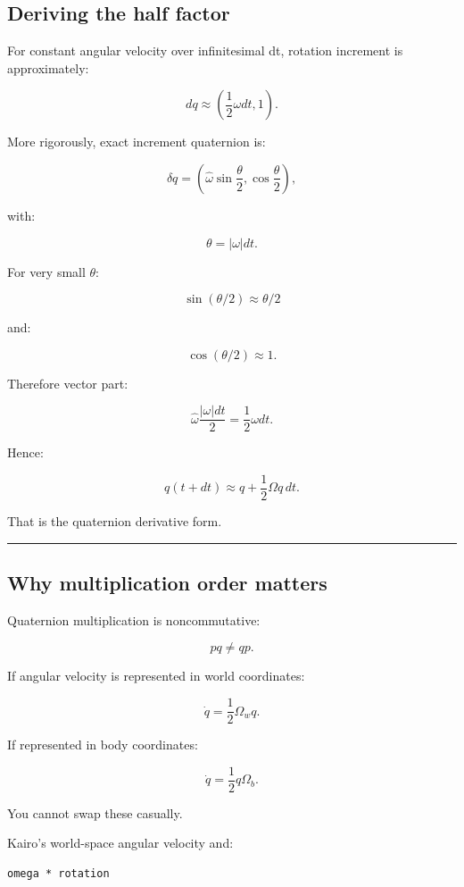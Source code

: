 \subsection{Deriving the half factor}\label{06-engine-ii-ch037-deriving-the-half-factor}

For constant angular velocity over infinitesimal dt, rotation increment is approximately:

\[
dq
\approx
\left(
\frac12\omega dt,
1
\right).
\]

More rigorously, exact increment quaternion is:

\[
\delta q
=
\left(
\hat\omega
\sin\frac{\theta}{2},
\cos\frac{\theta}{2}
\right),
\]

with:

\[
\theta
=
|\omega|dt.
\]

For very small \(\theta\):

\[
\sin(\theta/2)
\approx
\theta/2
\]

and:

\[
\cos(\theta/2)
\approx1.
\]

Therefore vector part:

\[
\hat\omega
\frac{|\omega|dt}{2}
=
\frac12\omega dt.
\]

Hence:

\[
q(t+dt)
\approx
q+
\frac12\Omega q\,dt.
\]

That is the quaternion derivative form.

\begin{center}\rule{0.5\linewidth}{0.5pt}\end{center}

\subsection{Why multiplication order matters}\label{06-engine-ii-ch037-why-multiplication-order-matters}

Quaternion multiplication is noncommutative:

\[
pq\neq qp.
\]

If angular velocity is represented in world coordinates:

\[
\dot q
=
\frac12\Omega_wq.
\]

If represented in body coordinates:

\[
\dot q
=
\frac12q\Omega_b.
\]

You cannot swap these casually.

Kairo's world-space angular velocity and:

\begin{verbatim}
omega * rotation
\end{verbatim}

